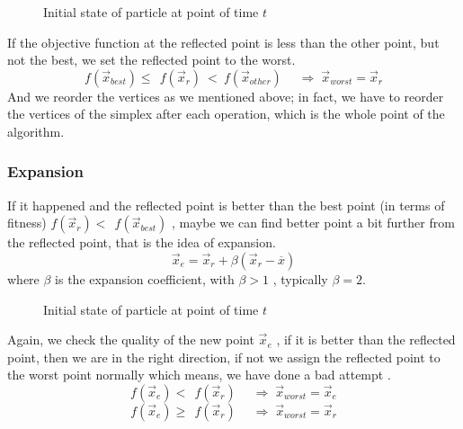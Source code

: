     \begin{figure}[htbp]
        \centering
        \scalebox{1.1}{}
        \caption{Initial state of particle at point of time $t$ }
        \label{fig:label}
    \end{figure}


If the objective function at the reflected point is less than the other
point, but not the best, we set the reflected point to the worst.\\
{\[f({\overset{\rightarrow}{x}}_{best}) \leq \ \ f({\overset{\rightarrow}{x}}_{r})\  < \ f({\overset{\rightarrow}{x}}_{other})\quad\;\Longrightarrow\;{\overset{\rightarrow}{x}}_{worst} = {\overset{\rightarrow}{x}}_{r}\]}And
we reorder the vertices as we mentioned above; in fact, we have to
reorder the vertices of the simplex after each operation, which is the
whole point of the algorithm.

\subsubsection{Expansion}

If it happened and the reflected point is better than the best point (in
terms of fitness)
{\(f({\overset{\rightarrow}{x}}_{r}) < \ \ f({\overset{\rightarrow}{x}}_{best})\)}
, maybe we can find better point a bit further from the reflected point,
that is the idea of expansion.\\
{\[{\overset{\rightarrow}{x}}_{e} = {\overset{\rightarrow}{x}}_{r} + \beta({\overset{\rightarrow}{x}}_{r} - \overline{x})\]}where
{\(\beta\)} is the expansion coefficient, with {\(\beta > 1\)} ,
typically {\(\beta = 2\)}.

    \begin{figure}[htbp]
        \centering
        \scalebox{1.1}{}
        \caption{Initial state of particle at point of time $t$ }
        \label{fig:label}
    \end{figure}


Again, we check the quality of the new point
{\({\overset{\rightarrow}{x}}_{e}\)} , if it is better than the
reflected point, then we are in the right direction, if not we assign
the reflected point to the worst point normally which means, we have
done a bad attempt .\\
{\[f({\overset{\rightarrow}{x}}_{e}) < \ \ f({\overset{\rightarrow}{x}}_{r})\quad\;\Longrightarrow\;{\overset{\rightarrow}{x}}_{worst} = {\overset{\rightarrow}{x}}_{e}\]}{\[f({\overset{\rightarrow}{x}}_{e}) \geq \ \ f({\overset{\rightarrow}{x}}_{r})\quad\;\Longrightarrow\;{\overset{\rightarrow}{x}}_{worst} = {\overset{\rightarrow}{x}}_{r}\]}


